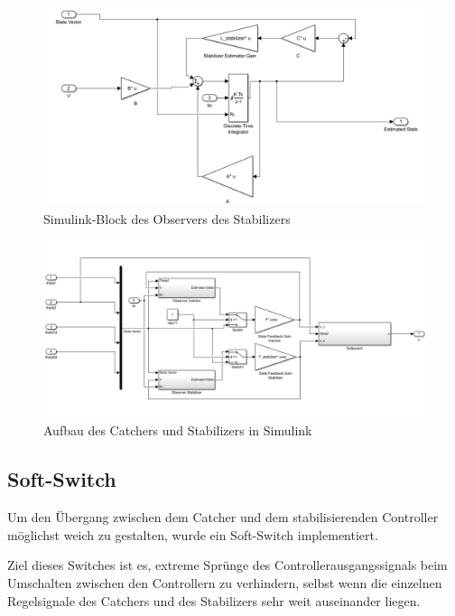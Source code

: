 \begin{figure}[htbp]
	\centering	
	\includegraphics[width=1\textwidth]{Grafiken/simulink_observer_stabilizer.png}
	\caption{Simulink-Block des Observers des Stabilizers}
	\label{fig.obs_stabilizer}
\end{figure}

\begin{figure}[h!]
	\centering	
	\includegraphics[width=1\textwidth]{Grafiken/simulink_top_equilibrium.png}
	\caption{Aufbau des Catchers und Stabilizers in Simulink}
	\label{fig.top_equilibrium}
\end{figure}

\subsection{Soft-Switch}
\label{Softswitch}
Um den Übergang zwischen dem Catcher und dem stabilisierenden Controller möglichst weich zu gestalten, wurde ein Soft-Switch implementiert.

Ziel dieses Switches ist es, extreme Sprünge des Controllerausgangssignals beim Umschalten zwischen den Controllern zu verhindern, selbst wenn die einzelnen Regelsignale des Catchers und des Stabilizers sehr weit auseinander liegen.

